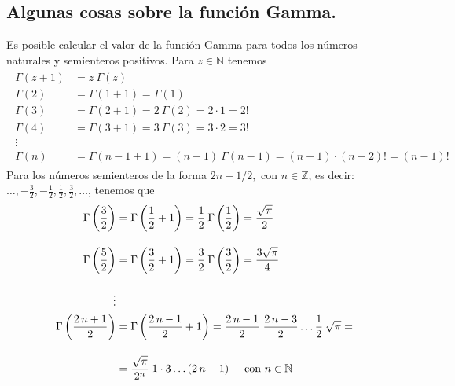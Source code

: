 \subsection{Algunas cosas sobre la función Gamma.}
Es posible calcular el valor de la función Gamma para todos los números naturales y semienteros positivos. Para $z \in \mathbb{N}$ tenemos
\begin{align*}
\begin{aligned}
\Gamma (z+1) &= z \: \Gamma (z) \\
\Gamma (2) &= \Gamma (1+1) = \Gamma (1) \\
\Gamma (3) &= \Gamma (2+1) = 2 \: \Gamma (2)= 2 \cdot 1 = 2! \\
\Gamma (4) &= \Gamma (3+1) = 3 \: \Gamma (3)= 3 \cdot 2 = 3! \\
\vdots \\
\Gamma (n) &= \Gamma (n-1+1) = (n-1) \: \Gamma (n-1)= (n - 1) \cdot (n - 2)! = (n-1)!
\end{aligned}
\end{align*}
Para los números semienteros de la forma $2n+1/2, \mbox{ con } n \in \mathbb{Z}$, es decir: $\ldots, -\frac{3}{2}, - \frac{1}{2}, \frac{1}{2}, \frac{3}{2}, \ldots$, tenemos que
\begin{align*}
\begin{aligned}
\Gamma \left( \dfrac{3}{2} \right) &= \Gamma \left( \dfrac{1}{2} + 1 \right) = \dfrac{1}{2} \: \Gamma \left( \dfrac{1}{2} \right) = \dfrac{\sqrt{\pi}}{2} \\[1em]
\Gamma \left( \dfrac{5}{2} \right) &= \Gamma \left( \dfrac{3}{2} + 1 \right) = \dfrac{3}{2} \: \Gamma \left( \dfrac{3}{2} \right) = \dfrac{3 \sqrt{\pi}}{4} \\[1em]
\vdots \\
\Gamma \left( \dfrac{2 \, n + 1}{2} \right) &= \Gamma \left( \dfrac{2 \, n - 1}{2} + 1 \right) = \dfrac{2 \, n - 1}{2} \; \dfrac{2 \, n - 3}{2} \ldots \dfrac{1}{2} \: \sqrt{\pi} =  \\[1em]
&= \dfrac{\sqrt{\pi}}{2^{n}} \; 1 \cdot 3 \ldots (2 \, n-1) \hspace{0.5cm} \mbox{con } n \in \mathbb{N}
\end{aligned}
\end{align*}
